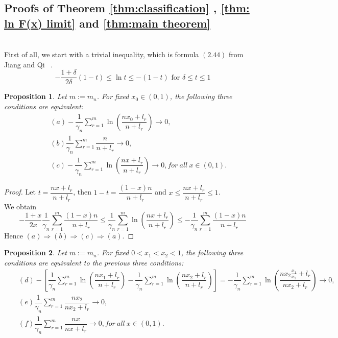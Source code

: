 \documentclass[12pt]{article}
\theoremstyle{plain}
\newtheorem{prop}{Proposition}[section]
\theoremstyle{definition}
\theoremstyle{remark}
\begin{document}
\subsection{Proofs of Theorem \ref{thm:classification} , \ref{thm: ln F(x) limit} and \ref{thm:main theorem}}
\ \\
    First of all, we start with a trivial inequality, which is formula $(2.44)$ from Jiang and Qi ~\cite{JiangQi2019}.
    \begin{equation} \label{inequality}
    -\frac{1+\delta}{2 \delta}(1-t) \leq \ln t \leq-(1-t) \text { for } \delta \leq t \leq 1
    \end{equation}
\begin{prop}
    Let $m:=m_n$. For fixed $x_0\in (0,1)$,
the following three conditions are equivalent:
\begin{eqnarray*}
&&(a) -\dfrac{1}{\gamma_{n}}\sum_{r=1}^{m}\ln(\dfrac{nx_0+l_r}{n+l_r})\to 0,\\
&&(b) \dfrac{1}{\gamma_{n}}\sum_{r=1}^{m}\dfrac{n}{n+l_r}\to 0,\\
&&(c)-\dfrac{1}{\gamma_{n}}\sum_{r=1}^{m}\ln(\dfrac{nx+l_r}{n+l_r})\to 0, for\ all\ x\in (0,1).
\end{eqnarray*}
\end{prop}
\begin{proof}
Let $t=\dfrac{nx+l_r}{n+l_r}$, then $1-t=\dfrac{(1-x)n}{n+l_r}$ and $x\leq \dfrac{nx+l_r}{n+l_r}\leq 1$.\\
We obtain
\begin{equation}\label{ineq}
-\frac{1+x}{2 x}\dfrac{1}{\gamma_{n}}\sum_{r=1}^{m}\dfrac{(1-x)n}{n+l_r} \leq  \dfrac{1}{\gamma_{n}}\sum_{r=1}^{m}\ln(\dfrac{nx+l_r}{n+l_r}) \leq-\dfrac{1}{\gamma_{n}}\sum_{r=1}^{m}\dfrac{(1-x)n}{n+l_r}
\end{equation}
Hence $(a)\Rightarrow (b)\Rightarrow (c)\Rightarrow (a)$.
\end{proof}
\begin{prop}
    Let $m:=m_n$. For fixed $0<x_1<x_2<1$,
    the following three conditions are equivalent to the previous three conditions:
\begin{eqnarray*}
&&(d) -[\dfrac{1}{\gamma_{n}}\sum_{r=1}^{m}\ln(\dfrac{nx_1+l_r}{n+l_r})-\dfrac{1}{\gamma_{n}}\sum_{r=1}^{m}\ln(\dfrac{nx_2+l_r}{n+l_r})]=-\dfrac{1}{\gamma_{n}}\sum_{r=1}^{m}\ln(\dfrac{nx_2\frac{x_1}{x_2}+l_r}{nx_2+l_r})\to 0,\\
&&(e) \dfrac{1}{\gamma_{n}}\sum_{r=1}^{m}\dfrac{nx_2}{nx_2+l_r}\to 0,\\
&&(f) \dfrac{1}{\gamma_{n}}\sum_{r=1}^{m}\dfrac{nx}{nx+l_r}\to 0, for\ all\ x\in (0,1).
\end{eqnarray*}
\end{prop}
\end{document}
